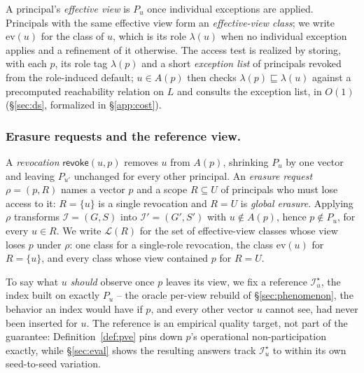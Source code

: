 \documentclass[sigconf, nonacm, review]{acmart}
\newcommand{\rev}{\mathsf{revoke}}
\begin{document}
A principal's \emph{effective view} is $P_u$ once individual exceptions are
applied. Principals with the same effective view form an \emph{effective-view
class}; we write $\mathrm{ev}(u)$ for the class of $u$, which is its role
$\lambda(u)$ when no individual exception applies and a refinement of it
otherwise. The access test is realized by storing, with each $p$, its role tag
$\lambda(p)$ and a short \emph{exception list} of principals revoked from the
role-induced default; $u\in A(p)$ then checks $\lambda(p)\sqsubseteq\lambda(u)$
against a precomputed reachability relation on $L$ and consults the exception
list, in $O(1)$ (\S\ref{sec:ds}, formalized in \S\ref{app:cost}).

\subsubsection{Erasure requests and the reference view.}
\label{app:requests}
\begin{sloppypar}
A \emph{revocation} $\rev(u,p)$ removes $u$ from $A(p)$, shrinking $P_u$ by
one vector and leaving $P_{u'}$ unchanged for every other principal. An
\emph{erasure request} $\rho=(p,R)$ names a vector $p$ and a scope
$R\subseteq U$ of principals who must lose access to it: $R=\{u\}$ is a single
revocation and $R=U$ is \emph{global erasure}. Applying $\rho$ transforms
$\mathcal{I}=(G,S)$ into $\mathcal{I}'=(G',S')$ with $u\notin A(p)$, hence
$p\notin P_u$, for every $u\in R$. We write $\mathcal{L}(R)$ for the set of
effective-view classes whose view loses $p$ under $\rho$: one class for a
single-role revocation, the class $\mathrm{ev}(u)$ for $R=\{u\}$, and every
class whose view contained $p$ for $R=U$.
\end{sloppypar}

To say what $u$ \emph{should} observe once $p$ leaves its view, we fix a
reference $\mathcal{I}^\star_u$, the index built on exactly $P_u$ -- the oracle
per-view rebuild of \S\ref{sec:phenomenon}, the behavior an index would have
if $p$, and every other vector $u$ cannot see, had never been inserted for
$u$. The reference is an empirical quality target, not part of the guarantee:
Definition~\ref{def:pve} pins down $p$'s operational non-participation exactly,
while \S\ref{sec:eval} shows the resulting answers track $\mathcal{I}^\star_u$
to within its own seed-to-seed variation.
\end{document}
